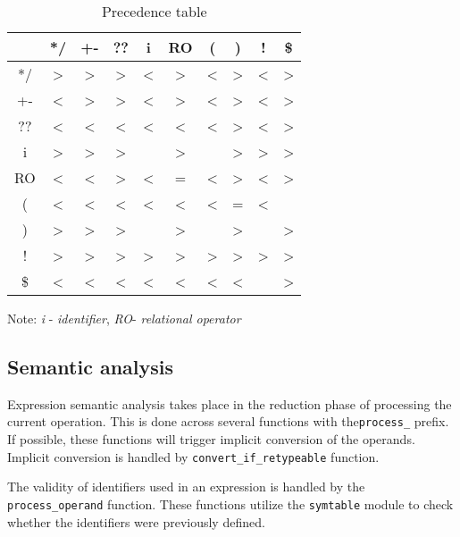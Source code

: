 \begin{table}[ht]
\centering
\label{table:precedence}
\begin{tabular}{| c | c c c | c c c | c c c |}
    \hline
        & */ & +- & ?? & i & RO &  (  &  )  & ! & \$ \\
    \hline
    */ & \textgreater & \textgreater & \textgreater & \textless & \textgreater & \textless & \textgreater & \textless & \textgreater \\
    +- & \textless & \textgreater & \textgreater  & \textless & \textgreater & \textless & \textgreater & \textless & \textgreater \\
    ?? & \textless & \textless & \textless & \textless & \textless & \textless & \textgreater & \textless & \textgreater \\
    \hline
    i  &  \textgreater & \textgreater & \textgreater &  & \textgreater &  & \textgreater & \textgreater & \textgreater \\
     RO & \textless & \textless & \textgreater & \textless & = & \textless & \textgreater & \textless & \textgreater \\
    (  & \textless & \textless & \textless & \textless & \textless & \textless & = & \textless &  \\
    \hline
    )  & \textgreater & \textgreater & \textgreater &  & \textgreater &  & \textgreater &  & \textgreater \\
    !  & \textgreater & \textgreater & \textgreater & \textgreater & \textgreater & \textgreater & \textgreater & \textgreater & \textgreater \\
    \$ & \textless & \textless & \textless & \textless & \textless & \textless & \textless &  & \textgreater \\
    \hline
\end{tabular}
\caption{Precedence table}
\begin{center}    
    \begin{minipage}{8cm}
          \small
          Note:
          \textit{i} - \textit{identifier},
          \textit{RO}- \textit{relational operator}
    \end{minipage}
\end{center}
\end{table}



\subsection{Semantic analysis}
Expression semantic analysis takes place in the reduction phase of processing the current operation. This is done across several functions with the\texttt{process\_} prefix. If possible, these functions will trigger implicit conversion of the operands. Implicit conversion is handled by \verb|convert_if_retypeable| function.

The validity of identifiers used in an expression is handled by the \verb|process_operand| function. These functions utilize the \verb|symtable| module to check whether the identifiers were previously defined.



